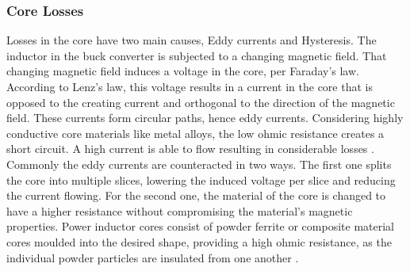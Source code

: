 \subsubsection{Core Losses}
Losses in the core have two main causes, Eddy currents and Hysteresis. The inductor in the buck converter is subjected to a changing magnetic field. That changing magnetic field induces a voltage in the core, per Faraday's law. According to Lenz's law, this voltage results in a current in the core that is opposed to the creating current and orthogonal to the direction of the magnetic field. These currents form circular paths, hence eddy currents. Considering highly conductive core materials like metal alloys, the low ohmic resistance creates a short circuit. A high current is able to flow resulting in considerable losses \cite{ararUnderstandingEffectEddy2024}.\\
Commonly the eddy currents are counteracted in two ways. The first one splits the core into multiple slices, lowering the induced voltage per slice and reducing the current flowing. For the second one, the material of the core is changed to have a higher resistance without compromising the material's magnetic properties. 
Power inductor cores consist of powder ferrite or composite material cores moulded into the desired shape, providing a high ohmic resistance, as the individual powder particles are insulated from one another \cite{dixon2001magnetics}.\\



